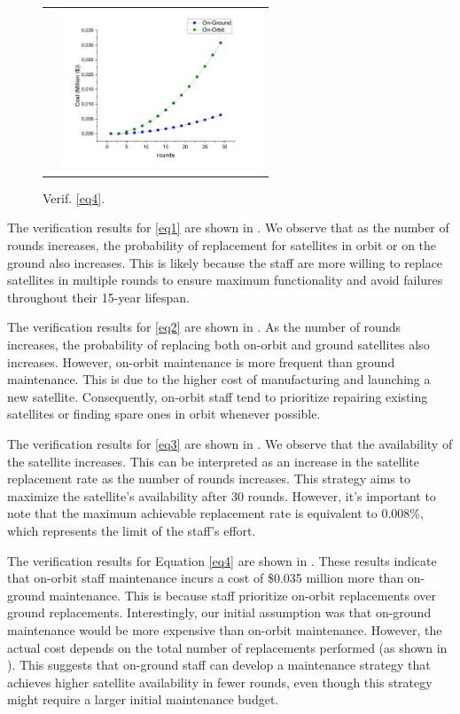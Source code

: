 \begin{figure}[htbp]
\begin{tabularx}{\linewidth}{m{8cm}  m{8cm}}
           &
           

 \begin{minipage}[t]{8cm}
     \centering

    \includegraphics[width=170pt, height =135pt]{Graph04.pdf}
    \caption{Verif. \ref{eq4}.}
    \label{fig:4}
   \end{minipage}
   
           \end{tabularx}
\end{figure}

The verification results for \ref{eq1} are shown in . We observe that as the number of rounds increases, the probability of replacement for satellites in orbit or on the ground also increases. This is likely because the staff are more willing to replace satellites in multiple rounds to ensure maximum functionality and avoid failures throughout their 15-year lifespan.

The verification results for \ref{eq2} are shown in . As the number of rounds increases, the probability of replacing both on-orbit and ground satellites also increases. However, on-orbit maintenance is more frequent than ground maintenance. This is due to the higher cost of manufacturing and launching a new satellite. Consequently, on-orbit staff tend to prioritize repairing existing satellites or finding spare ones in orbit whenever possible.

The verification results for \ref{eq3} are shown in . We observe that the availability of the satellite increases. This can be interpreted as an increase in the satellite replacement rate as the number of rounds increases. This strategy aims to maximize the satellite's availability after 30 rounds. However, it's important to note that the maximum achievable replacement rate is equivalent to 0.008\%, which represents the limit of the staff's effort.


The verification results for Equation \ref{eq4} are shown in . These results indicate that on-orbit staff maintenance incurs a cost of \$0.035 million more than on-ground maintenance. This is because staff prioritize on-orbit replacements over ground replacements. Interestingly, our initial assumption was that on-ground maintenance would be more expensive than on-orbit maintenance. However, the actual cost depends on the total number of replacements performed (as shown in ). This suggests that on-ground staff can develop a maintenance strategy that achieves higher satellite availability in fewer rounds, even though this strategy might require a larger initial maintenance budget.

